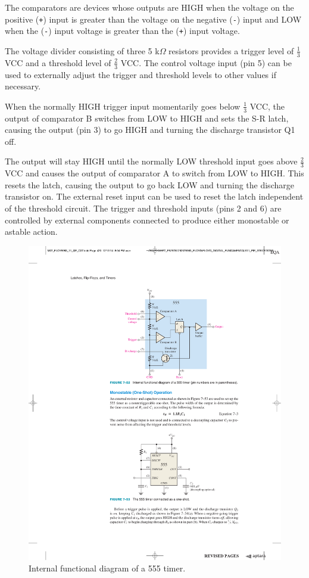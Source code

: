 The comparators are devices whose outputs are HIGH when the voltage on the positive (\texttt{+}) input is greater than the voltage on the negative (\texttt{-}) input and LOW when the (\texttt{-}) input voltage is greater than the (\texttt{+}) input voltage. \medskip

The voltage divider consisting of three 5 k$\Omega$ resistors provides a trigger level of $\frac{1}{3}$ VCC and a threshold level of $\frac{2}{3}$ VCC. The control voltage input (pin 5) can be used to externally adjust the trigger and threshold levels to other values if necessary.\medskip 

When the normally HIGH trigger input momentarily goes below $\frac{1}{3}$ VCC, the output of comparator B switches from LOW to HIGH and sets the S-R latch, causing the output (pin 3) to go HIGH and turning the discharge transistor Q1 off.\medskip

The output will stay HIGH until the normally LOW threshold input goes above $\frac{2}{3}$ VCC and
causes the output of comparator A to switch from LOW to HIGH. This resets the latch,
causing the output to go back LOW and turning the discharge transistor on. The external
reset input can be used to reset the latch independent of the threshold circuit. The trigger
and threshold inputs (pins 2 and 6) are controlled by external components connected to
produce either monostable or astable action. ~\autocite{FLOYD}


\begin{figure}[H]
    \centering
    \includegraphics[scale = 0.99]{Graphics/VHDL/Practice 2/GRAPHICS/555/GRAPHS/DATASHEETS/555_INTERNALS.pdf}
    \caption{Internal functional diagram of a 555 timer. ~\autocite{FLOYD}}
    \label{fig:555_DIAGRAM}
\end{figure}


